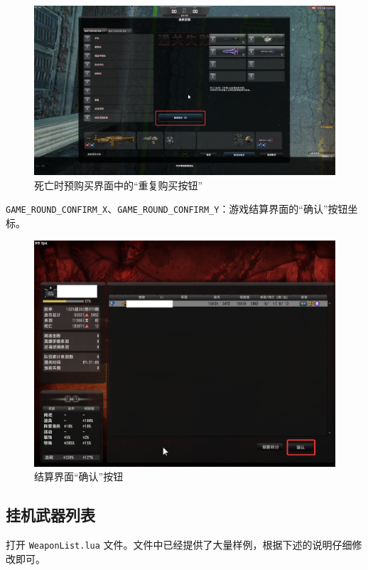 \begin{figure}[H]
    \Centering
    \includegraphics[width=\textwidth]{docs/assets/dead_purchase_rebuy.png}
    \caption{死亡时预购买界面中的“重复购买按钮”}
\end{figure}

\lstinline{GAME_ROUND_CONFIRM_X}、\lstinline{GAME_ROUND_CONFIRM_Y}：游戏结算界面的“确认”按钮坐标。

\begin{figure}[H]
    \Centering
    \includegraphics[width=\textwidth]{docs/assets/confirm_round.png}
    \caption{结算界面“确认”按钮}
\end{figure}

\subsection{挂机武器列表}

打开 \lstinline{WeaponList.lua} 文件。文件中已经提供了大量样例，根据下述的说明仔细修改即可。

